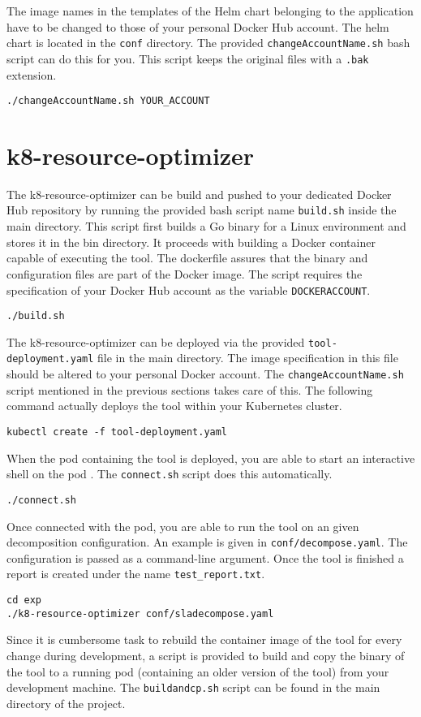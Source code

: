\noindent The image names in the templates of the Helm chart belonging to the application have to be changed to those of your personal Docker Hub account. The helm chart is located in the \texttt{conf} directory. The provided \texttt{changeAccountName.sh} bash script can do this for you. This script keeps the original files with a \texttt{.bak} extension.
\begin{lstlisting}
./changeAccountName.sh YOUR_ACCOUNT
\end{lstlisting}

\section{k8-resource-optimizer}
The k8-resource-optimizer can be build and pushed to your dedicated Docker Hub repository by running the provided bash script name \texttt{build.sh} inside the main directory. This script first builds a Go binary for a Linux environment and stores it in the bin directory. It proceeds with building a Docker container capable of executing the tool. The dockerfile assures that the binary and configuration files are part of the Docker image. The script requires the specification of your Docker Hub account as the variable \texttt{DOCKERACCOUNT}.
\begin{lstlisting}
./build.sh
\end{lstlisting}

\noindent The k8-resource-optimizer can be deployed via the provided \texttt{tool-deployment.yaml} file in the main directory. The image specification in this file should be altered to your personal Docker account. The \texttt{changeAccountName.sh} script mentioned in the previous sections takes care of this. The following command actually deploys the tool within your Kubernetes cluster.
\begin{lstlisting}
kubectl create -f tool-deployment.yaml
\end{lstlisting}
When the pod containing the tool is deployed, you are able to start an interactive shell on the pod . The \texttt{connect.sh} script does this automatically. 
\begin{lstlisting}
./connect.sh
\end{lstlisting}

Once connected with the pod, you are able to run the tool on an given decomposition configuration. An example is given in \texttt{conf/decompose.yaml}. The configuration is passed as a command-line argument. Once the tool is finished a report is created under the name \texttt{test\_report.txt}.
\begin{lstlisting}
cd exp
./k8-resource-optimizer conf/sladecompose.yaml
\end{lstlisting}
Since it is cumbersome task to rebuild the container image of the tool for every change during development, a script is provided to build and copy the binary of the tool to a running pod (containing an older version of the tool) from your development machine. The \texttt{buildandcp.sh} script can be found in the main directory of the project.

